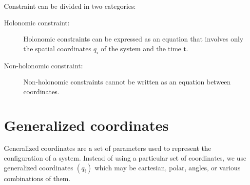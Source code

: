 \documentclass{article}
\begin{document}
Constraint can be divided in two categories:
\begin{description}
    \item[Holonomic constraint:] Holonomic constraints can be expressed as an equation that involves only the spatial coordinates $q_i$
    of the system and the time t.   
    \item[Non-holonomic constraint:] Non-holonomic constraints cannot be written as an equation between coordinates.
\end{description}

\section*{Generalized coordinates}
Generalized coordinates are a set of parameters used to represent the configuration of a system. Instead of using a particular 
set of coordinates, we use generalized coordinates $(q_i)$ which may be cartesian, polar, angles, or various combinations of them.
\end{document}
